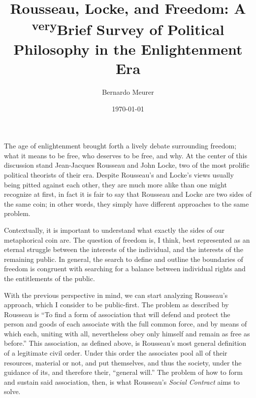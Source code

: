 \documentclass[12pt,letterpaper]{article}
\title{Rousseau, Locke, and Freedom: A \textsuperscript{\scriptsize{very}}Brief Survey of Political Philosophy in
the Enlightenment Era}
\author{Bernardo Meurer}
\date{\today}
\begin{document}
\maketitle
\newpage
\begin{spacing}{2}
    The age of enlightenment brought forth a lively debate surrounding freedom;
    what it means to be free, who deserves to be free, and why. At the center
    of this discussion stand Jean-Jacques Rousseau and John Locke, two of the
    most prolific political theorists of their era. Despite Rousseau's and
    Locke's views usually being pitted against each other, they are much more
    alike than one might recognize at first, in fact it is fair to say that
    Rousseau and Locke are two sides of the same coin; in other words, they
    simply have different approaches to the same problem.

    Contextually, it is important to understand what exactly the sides of our
    metaphorical coin are. The question of freedom is, I think, best represented
    as an eternal struggle between the interests of the individual, and the
    interests of the remaining public. In general, the search to define and
    outline the boundaries of freedom is congruent with searching for a balance
    between individual rights and the entitlements of the public.

    With the previous perspective in mind, we can start analyzing Rousseau's
    approach, which I consider to be public-first. The problem as described by
    Rousseau is ``To find a form of association that will defend and protect
    the person and goods of each associate with the full common force, and by
    means of which each, uniting with all, nevertheless
    obey only himself and remain as free as before.''\autocite[p.~49]{rousseau-1997}
    This association, as defined above, is Rousseau's most general definition of
    a legitimate civil order.\autocite[p.~xvii]{rousseau-1997} Under this order
    the associates pool all of their resources, material or not, and put
    themselves, and thus the society, under the guidance of its, and therefore
    their, ``general
    will.''\autocites[p.~xvii]{rousseau-1997}[p.~78]{perry-bock-2012} The
    problem of how to form and sustain said association, then, is what
    Rousseau's \textit{Social Contract} aims to
    solve.\autocite[p.~78]{perry-bock-2012}


\end{spacing}
\end{document}
